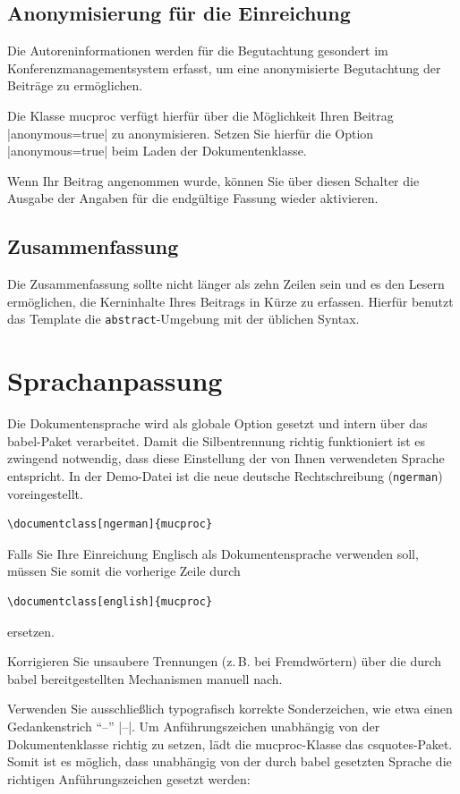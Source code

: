 \documentclass[ngerman]{mucproc}
\newenvironment{minted}[2][]{\endgraf\verbatim}{\endverbatim}
\begin{document}
\subsection{Anonymisierung für die Einreichung}
Die Autoreninformationen werden für die Begutachtung gesondert im Konferenzmanagementsystem erfasst, um eine anonymisierte Begutachtung der Beiträge zu ermöglichen.

Die Klasse \textsf{mucproc} verfügt hierfür über die Möglichkeit Ihren Beitrag |anonymous=true| zu anonymisieren. Setzen Sie hierfür die Option |anonymous=true| beim Laden der Dokumentenklasse.

Wenn Ihr Beitrag angenommen wurde, können Sie über diesen Schalter die Ausgabe der Angaben für die endgültige Fassung wieder aktivieren.

\subsection{Zusammenfassung}
Die Zusammenfassung sollte nicht länger als zehn Zeilen sein und es den Lesern  ermöglichen, die Kerninhalte Ihres Beitrags in Kürze zu erfassen. Hierfür benutzt das Template die \texttt{abstract}-Umgebung mit der üblichen Syntax.


\section{Sprachanpassung}
Die Dokumentensprache wird als globale Option gesetzt und intern über das \textsf{babel}-Paket verarbeitet. Damit die Silbentrennung richtig funktioniert ist es zwingend notwendig, dass diese Einstellung der von Ihnen verwendeten Sprache entspricht. In der Demo-Datei ist die neue deutsche Rechtschreibung (\texttt{ngerman}) voreingestellt.
\begin{verbatim}
\documentclass[ngerman]{mucproc}
\end{verbatim}
Falls Sie Ihre Einreichung Englisch als Dokumentensprache verwenden soll, müssen Sie somit die vorherige Zeile durch
\begin{verbatim}
\documentclass[english]{mucproc}
\end{verbatim}
ersetzen.

Korrigieren Sie unsaubere Trennungen (z.\,B. bei Fremdwörtern) über die durch \textsf{babel} bereitgestellten Mechanismen manuell nach.

Verwenden Sie ausschließlich typografisch korrekte Sonderzeichen, wie etwa einen Gedankenstrich \enquote{--} |--|. Um Anführungszeichen unabhängig von der Dokumentenklasse richtig zu setzen, lädt die \textsf{mucproc}-Klasse das \textsf{csquotes}-Paket. Somit ist es möglich, dass unabhängig von der durch \textsf{babel} gesetzten Sprache die richtigen Anführungszeichen gesetzt werden:
\end{document}

